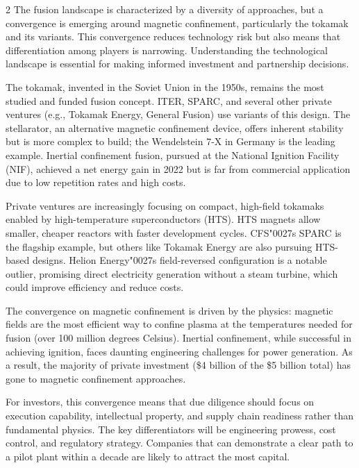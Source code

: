 \documentclass[10pt,a4paper]{article}
\newcommand{\BOApos}{{\BOQuoteFont\char"0027}}
\begin{document}
\begin{multicols}{2}
{\small The fusion landscape is characterized by a diversity of approaches, but a convergence is emerging around magnetic confinement, particularly the tokamak and its variants. This convergence reduces technology risk but also means that differentiation among players is narrowing. Understanding the technological landscape is essential for making informed investment and partnership decisions.}\par
{\small The tokamak, invented in the Soviet Union in the 1950s, remains the most studied and funded fusion concept. ITER, SPARC, and several other private ventures (e.g., Tokamak Energy, General Fusion) use variants of this design. The stellarator, an alternative magnetic confinement device, offers inherent stability but is more complex to build; the Wendelstein 7-X in Germany is the leading example. Inertial confinement fusion, pursued at the National Ignition Facility (NIF), achieved a net energy gain in 2022 but is far from commercial application due to low repetition rates and high costs.}\par
{\small Private ventures are increasingly focusing on compact, high-field tokamaks enabled by high-temperature superconductors (HTS). HTS magnets allow smaller, cheaper reactors with faster development cycles. CFS\BOApos{}s SPARC is the flagship example, but others like Tokamak Energy are also pursuing HTS-based designs. Helion Energy\BOApos{}s field-reversed configuration is a notable outlier, promising direct electricity generation without a steam turbine, which could improve efficiency and reduce costs.}\par
{\small The convergence on magnetic confinement is driven by the physics: magnetic fields are the most efficient way to confine plasma at the temperatures needed for fusion (over 100 million degrees Celsius). Inertial confinement, while successful in achieving ignition, faces daunting engineering challenges for power generation. As a result, the majority of private investment (\$4 billion of the \$5 billion total) has gone to magnetic confinement approaches.}\par
{\small For investors, this convergence means that due diligence should focus on execution capability, intellectual property, and supply chain readiness rather than fundamental physics. The key differentiators will be engineering prowess, cost control, and regulatory strategy. Companies that can demonstrate a clear path to a pilot plant within a decade are likely to attract the most capital.}\par
\end{multicols}
\label{chap:2:end}
\end{document}

